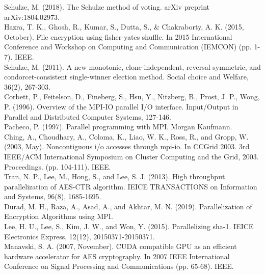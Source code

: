 \documentclass[final,5p,times,twocolumn,authoryear, 10pt]{elsarticle}
\begin{document}
\begin{thebibliography}{20}

Schulze, M. (2018). The Schulze method of voting. arXiv preprint
arXiv:1804.02973. 
\\
Hazra, T. K., Ghosh, R., Kumar, S., Dutta, S., \& Chakraborty, A. K. (2015,
October). File encryption using fisher-yates shuffle. In 2015 International
Conference and Workshop on Computing and Communication (IEMCON) (pp. 1-7).
IEEE.
\\ 
Schulze, M. (2011). A new monotonic, clone-independent, reversal symmetric, and
condorcet-consistent single-winner election method. Social choice and Welfare,
36(2), 267-303.
\\
Corbett, P., Feitelson, D., Fineberg, S., Hsu, Y., Nitzberg, B., Prost, J. P.,
Wong, P. (1996). Overview of the MPI-IO parallel I/O interface. Input/Output in
Parallel and Distributed Computer Systems, 127-146.
\\
Pacheco, P. (1997). Parallel programming with MPI. Morgan Kaufmann.
\\
Ching, A., Choudhary, A., Coloma, K., Liao, W. K., Ross, R., and Gropp, W.
(2003, May). Noncontiguous i/o accesses through mpi-io. In CCGrid 2003. 3rd
IEEE/ACM International Symposium on Cluster Computing and the Grid, 2003.
Proceedings. (pp. 104-111). IEEE. \\

Tran, N. P., Lee, M., Hong, S., and Lee, S. J. (2013). High throughput
parallelization of AES-CTR algorithm. IEICE TRANSACTIONS on Information and
Systems, 96(8), 1685-1695. \\

Durad, M. H., Raza, A., Asad, A., and Akhtar, M. N. (2019). Parallelization of
Encryption Algorithms using MPI. \\

Lee, H. U., Lee, S., Kim, J. W., and Won, Y. (2015). Parallelizing sha-1. IEICE
Electronics Express, 12(12), 20150371-20150371. \\

Manavski, S. A. (2007, November). CUDA compatible GPU as an efficient hardware
accelerator for AES cryptography. In 2007 IEEE International Conference on
Signal Processing and Communications (pp. 65-68). IEEE.



\end{thebibliography}
\end{document}
